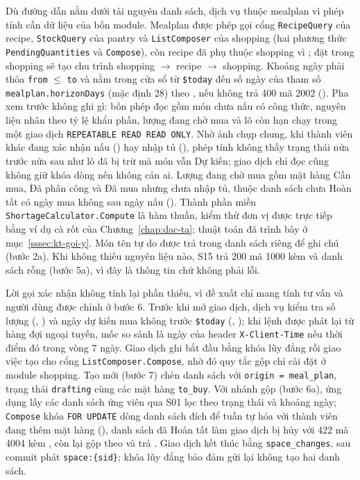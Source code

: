 Dù đường dẫn nằm dưới tài nguyên danh sách, dịch vụ thuộc mealplan vì phép tính cần dữ liệu của bốn module. Mealplan được phép gọi cổng \texttt{RecipeQuery} của recipe, \texttt{StockQuery} của pantry và \texttt{ListComposer} của shopping (hai phương thức \texttt{PendingQuantities} và \texttt{Compose}), còn recipe đã phụ thuộc shopping vì ; đặt  trong shopping sẽ tạo chu trình shopping $\to$ recipe $\to$ shopping. Khoảng ngày phải thỏa \texttt{from} $\le$ \texttt{to} và nằm trong cửa sổ từ \texttt{\$today} đến số ngày của tham số \texttt{mealplan.horizonDays} (mặc định 28) theo , nếu không trả 400 mã 2002 (). Pha xem trước không ghi gì: bốn phép đọc gồm món chưa nấu có công thức, nguyên liệu nhân theo tỷ lệ khẩu phần, lượng đang chờ mua và lô còn hạn chạy trong một giao dịch \texttt{REPEATABLE READ READ ONLY}. Nhờ ảnh chụp chung, khi thành viên khác đang xác nhận nấu () hay nhập tủ (), phép tính không thấy trạng thái nửa trước nửa sau như lô đã bị trừ mà món vẫn Dự kiến; giao dịch chỉ đọc cũng không giữ khóa dòng nên không cản ai. Lượng đang chờ mua gồm mặt hàng Cần mua, Đã phân công và Đã mua nhưng chưa nhập tủ, thuộc danh sách chưa Hoàn tất có ngày mua không sau ngày nấu (). Thành phần miền \texttt{ShortageCalculator.Compute} là hàm thuần, kiểm thử đơn vị được trực tiếp bằng ví dụ cà rốt của Chương~\ref{chap:dac-ta}; thuật toán đã trình bày ở mục~\ref{sssec:kt-goi-y}. Món tên tự do được trả trong danh sách riêng để ghi chú (bước 2a). Khi không thiếu nguyên liệu nào, S15 trả 200 mã 1000 kèm  và danh sách rỗng (bước 5a), vì đây là thông tin chứ không phải lỗi.

Lời gọi xác nhận không tính lại phần thiếu, vì đề xuất chỉ mang tính tư vấn và người dùng được chỉnh ở bước 6. Trước khi mở giao dịch, dịch vụ kiểm tra số lượng (, ) và ngày dự kiến mua không trước \texttt{\$today} (, ); khi lệnh được phát lại từ hàng đợi ngoại tuyến, mốc so sánh là ngày của header \texttt{X-Client-Time} nếu thời điểm đó trong vòng 7 ngày. Giao dịch ghi bắt đầu bằng khóa lũy đẳng rồi giao việc tạo cho cổng \texttt{ListComposer.Compose}, nhờ đó quy tắc gộp chỉ cài đặt ở module shopping. Tạo mới (bước 7) chèn danh sách với \texttt{origin = meal\_plan}, trạng thái \texttt{drafting} cùng các mặt hàng \texttt{to\_buy}. Với nhánh gộp (bước 6a), ứng dụng lấy các danh sách ứng viên qua S01 lọc theo trạng thái và khoảng ngày; \texttt{Compose} khóa \texttt{FOR UPDATE} dòng danh sách đích để tuần tự hóa với thành viên đang thêm mặt hàng (), danh sách đã Hoàn tất làm giao dịch bị hủy với 422 mã 4004 kèm , còn lại gộp theo  và trả . Giao dịch kết thúc bằng \texttt{space\_changes}, sau commit phát \texttt{space:\{sid\}}; khóa lũy đẳng bảo đảm gửi lại không tạo hai danh sách.

